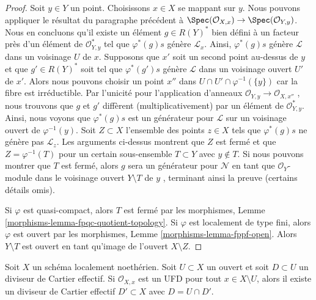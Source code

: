 \begin{proof}
\medskip\noindent
Soit  $y \in Y$  un point. Choisissons  $x \in X$  se mappant sur  $y$.
Nous pouvons appliquer le résultat du paragraphe précédent à  $\Spec(\mathcal{O}_{X, x}) \to \Spec(\mathcal{O}_{Y, y})$. Nous en
concluons qu'il existe un élément  $g \in R(Y)^*$  bien défini à un facteur près d'un
élément de  $\mathcal{O}_{Y, y}^*$  tel que  $\varphi^*(g)s$  génère  $\mathcal{L}_x$. Ainsi,
 $\varphi^*(g)s$  génère  $\mathcal{L}$  dans un voisinage  $U$  de  $x$.
Supposons que  $x'$  soit un second point au-dessus de  $y$  et que
 $g' \in R(Y)^*$  soit tel que  $\varphi^*(g')s$  génère  $\mathcal{L}$  dans un voisinage
ouvert  $U'$  de  $x'$. Alors nous pouvons choisir un point
 $x''$  dans  $U \cap U' \cap \varphi^{-1}(\{y\})$  car la fibre est irréductible. Par l'unicité pour
l'application d'anneaux  $\mathcal{O}_{Y, y} \to \mathcal{O}_{X, x''}$ , nous trouvons que  $g$  et
 $g'$  diffèrent (multiplicativement) par un élément de  $\mathcal{O}_{Y, y}^*$. Ainsi,
nous voyons que  $\varphi^*(g)s$  est un générateur pour  $\mathcal{L}$  sur un voisinage
ouvert de  $\varphi^{-1}(y)$. Soit  $Z \subset X$  l'ensemble des points  $z \in X$  tels
que  $\varphi^*(g)s$  ne génère pas  $\mathcal{L}_z$. Les arguments ci-dessus montrent que
 $Z$  est fermé et que  $Z = \varphi^{-1}(T)$  pour un certain sous-ensemble
 $T \subset Y$  avec  $y \not \in T$. Si nous pouvons montrer que  $T$  est
fermé, alors  $g$  sera un générateur pour  $\mathcal{N}$  en tant que
 $\mathcal{O}_Y$-module dans le voisinage ouvert  $Y \setminus T$  de  $y$ ,
terminant ainsi la preuve (certains détails omis).

\medskip\noindent
Si  $\varphi$  est quasi-compact, alors  $T$  est fermé par les
morphismes, Lemme  \ref{morphisms-lemma-fpqc-quotient-topology}. Si  $\varphi$  est localement de type fini, alors
 $\varphi$  est ouvert par les morphismes, Lemme  \ref{morphisms-lemma-fppf-open}. Alors  $Y \setminus T$ 
est ouvert en tant qu'image de l'ouvert  $X \setminus Z$.
\end{proof}

\begin{lemma}
\label{lemma-closure-effective-cartier-divisor}
Soit  $X$  un schéma localement noethérien. Soit  $U \subset X$  un ouvert et
soit  $D \subset U$  un diviseur de Cartier effectif. Si  $\mathcal{O}_{X, x}$  est un UFD pour
tout  $x \in X \setminus U$, alors il existe un diviseur de Cartier effectif  $D' \subset X$ 
avec  $D = U \cap D'$.
\end{lemma}

